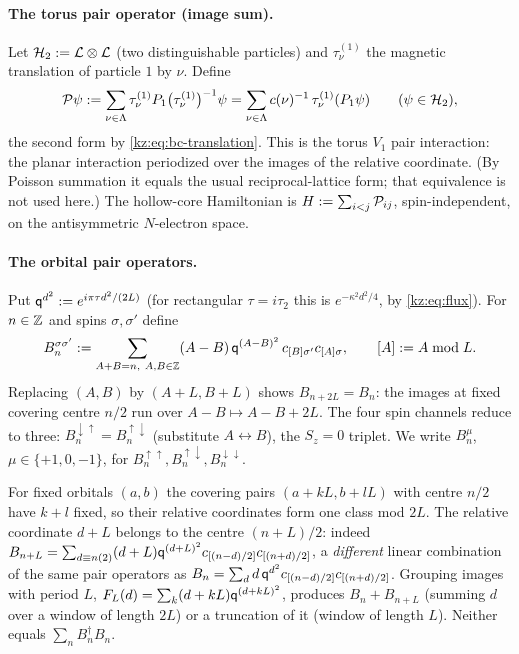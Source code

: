 \paragraph{The torus pair operator (image sum).} Let $\mathcal{H}_2:=\mathcal{L}\otimes\mathcal{L}$ (two distinguishable
particles) and $\tau^{(1)}_\nu$ the magnetic translation of particle $1$ by $\nu$. Define
\begin{equation}\label{kz:eq:image-sum}
\mathcal{P}\psi:=\sum_{\nu\in\Lambda}\tau^{(1)}_\nu P_1\big(\tau^{(1)}_\nu\big)^{-1}\psi
=\sum_{\nu\in\Lambda}c(\nu)^{-1}\,\tau^{(1)}_\nu(P_1\psi)\qquad(\psi\in\mathcal{H}_2),
\end{equation}
the second form by \eqref{kz:eq:bc-translation}. This is the torus $V_1$ pair interaction: the planar
interaction periodized over the images of the relative coordinate. (By Poisson summation it equals
the usual reciprocal-lattice form; that equivalence is not used here.) The
hollow-core Hamiltonian is $H:=\sum_{i<j}\mathcal{P}_{ij}$, spin-independent, on the antisymmetric
$N$-electron space.

\paragraph{The orbital pair operators.} Put $\mathsf{q}^{d^2}:=e^{i\pi\tau d^2/(2L)}$ (for rectangular
$\tau=i\tau_2$ this is $e^{-\kappa^2d^2/4}$, by \eqref{kz:eq:flux}).
For $n\in\mathbb{Z}$ and spins $\sigma,\sigma'$ define
\begin{equation}\label{kz:eq:Bn}
B_n^{\sigma\sigma'}:=\sum_{A+B=n,\ A,B\in\Z}(A-B)\,\kzq^{(A-B)^2}\,c_{[B]\sigma'}c_{[A]\sigma},
\qquad [A]:=A\bmod L .
\end{equation}
Replacing $(A,B)$ by $(A+L,B+L)$ shows $B_{n+2L}=B_n$: the images at fixed covering centre $n/2$
run over $A-B\mapsto A-B+2L$. The four spin channels reduce to three: $B_n^{\downarrow\uparrow}=B_n^{\uparrow\downarrow}$
(substitute $A\leftrightarrow B$), the $S_z=0$ triplet. We write $B_n^{\mu}$, $\mu\in\{+1,0,-1\}$, for
$B_n^{\uparrow\uparrow},B_n^{\uparrow\downarrow},B_n^{\downarrow\downarrow}$.

\begin{remark}\label{kz:rem:periodL}
For fixed orbitals $(a,b)$ the covering pairs $(a+kL,b+lL)$ with centre $n/2$ have $k+l$ fixed, so
their relative coordinates form one class mod $2L$. The relative coordinate $d+L$ belongs to the
centre $(n+L)/2$: indeed $B_{n+L}=\sum_{d\equiv n(2)}(d+L)\mathsf{q}^{(d+L)^2}c_{[(n-d)/2]}c_{[(n+d)/2]}$, a
\emph{different} linear combination of the same pair operators as
$B_n=\sum_d d\,\mathsf{q}^{d^2}c_{[(n-d)/2]}c_{[(n+d)/2]}$. Grouping images with period $L$,
$F_L(d)=\sum_k(d+kL)\mathsf{q}^{(d+kL)^2}$, produces $B_n+B_{n+L}$ (summing $d$ over a window of length
$2L$) or a truncation of it (window of length $L$). Neither equals $\sum_n B_n^\dagger B_n$.
\end{remark}


